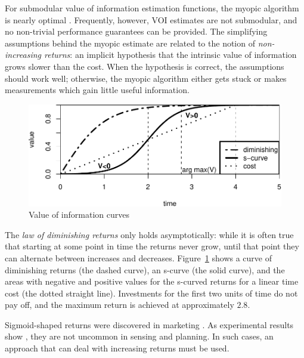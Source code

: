 For submodular value of information estimation functions, the myopic algorithm 
is nearly optimal \cite{Guestrin.submodular}. Frequently, however, VOI estimates
are not submodular, and no non-trivial performance guarantees can be provided.
The simplifying assumptions behind the myopic estimate  are related
to the notion of {\it non-increasing returns}: an implicit hypothesis that the intrinsic
value of information grows slower than the cost. When the hypothesis is correct,
the assumptions should work well; otherwise, the myopic algorithm either
gets stuck or makes measurements which gain little useful information.

\begin{figure}[h]
\centering
\includegraphics[scale=0.48]{s-curve.pdf}
\caption{Value of information curves} 
\label{fig:greedy-s-curve}
\end{figure} 

The {\it law of diminishing returns} \cite{Johns.economics}
only holds asymptotically: while it is often true that starting at
some point in time the returns never grow, until that point they can
alternate between increases and decreases. Figure~\ref{fig:greedy-s-curve}
shows a curve of diminishing returns (the
dashed curve), an s-curve (the solid curve), and the areas with
negative and positive values for the s-curved returns for a linear
time cost (the dotted straight line). Investments for the first two units
of time do not pay off, and the maximum return is achieved at
approximately $2.8$.

Sigmoid-shaped returns were discovered in marketing
\cite{Johansson.s-curve}.  As experimental results show
\cite{Zilberstein.sensing}, they are not uncommon in sensing and
planning. In such cases, an approach that can deal with increasing
returns must be used.

